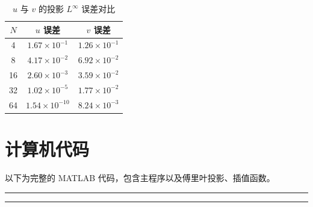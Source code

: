 \documentclass{article}
\begin{document}
\begin{table}[!htb]
\caption{$u$ 与 $v$ 的投影 $L^\infty$ 误差对比}
\centering
\begin{tabular}{c c c}
\toprule
$N$ & $u$ 误差 & $v$ 误差 \\
\midrule
4  & $1.67\times10^{-1}$ & $1.26\times10^{-1}$ \\
8  & $4.17\times10^{-2}$ & $6.92\times10^{-2}$ \\
16 & $2.60\times10^{-3}$ & $3.59\times10^{-2}$ \\
32 & $1.02\times10^{-5}$ & $1.77\times10^{-2}$ \\
64 & $1.54\times10^{-10}$ & $8.24\times10^{-3}$ \\
\bottomrule
\end{tabular}
\label{tab:compare_loss}
\end{table}

\newpage

\section{计算机代码}
以下为完整的 MATLAB 代码，包含主程序以及傅里叶投影、插值函数。

\small
\hrule

\hrule
\end{document}
